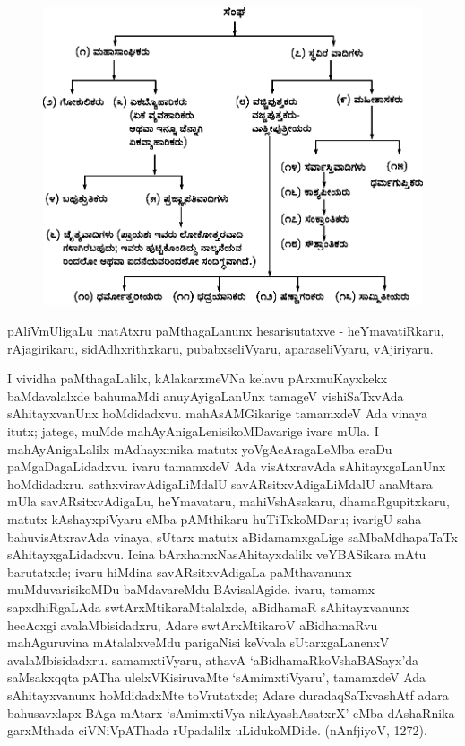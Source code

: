 \begin{figure}[h]
\centering
\includegraphics[scale=.87]{figures/fig3.eps}
\end{figure}
\noindent
pAliVmUligaLu matAtxru paMthagaLanunx hesarisutatxve - heYmavatiRkaru, rAjagirikaru, sidAdhxrithxkaru, pubabxseliVyaru, aparaseliVyaru, vAjiriyaru.

I vividha paMthagaLalilx, kAlakarxmeVNa kelavu pArxmuKayxkekx baMdavalalxde bahumaMdi anuyAyigaLanUnx tamageV vishiSaTxvAda sAhitayxvanUnx hoMdidadxvu. mahAsAMGika\-rige tamamxdeV Ada vinaya itutx; jatege, muMde mahAyAnigaLenisikoMDavarige ivare mUla. I mahAyAnigaLalilx  mAdhayxmika matutx yoVgAcAragaLeMba eraDu paMgaDa\-gaLidadxvu. ivaru tamamxdeV Ada visAtxravAda sAhitayxgaLanUnx  hoMdidadxru. sathxvira\-vAdigaLiMdalU savARsitxvAdigaLiMdalU anaMtara mUla savARsitxvAdigaLu, heYma\-vataru, mahiVshAsakaru, dhamaRgupitxkaru, matutx kAshayxpiVyaru eMba pAMthikaru huTiTx\-koMDaru; ivarigU saha bahuvisAtxravAda vinaya, sUtarx matutx aBidamamxgaLige saMbaMdhapaTaTx sAhitayxgaLidadxvu. Icina bArxhamxNasAhitayxdalilx veYBASikara mAtu barutatxde; ivaru hiMdina savARsitxvAdigaLa paMthavanunx muMduvarisikoMDu baMdavareMdu BAvisalAgide. ivaru, tamamx sapxdhiRgaLAda swtArxMtikaraMtalalxde, aBidhamaR sAhitayx\-vanunx hecAcxgi avalaMbisidadxru, Adare swtArxMtikaroV aBidhamaRvu mahAguruvina mAtalalxveMdu parigaNisi keVvala sUtarxgaLanenxV avalaMbisidadxru. samamxtiVyaru, athavA `aBidhamaRkoVshaBASayx'da saMsakxqqta pATha ulelxVKisiruvaMte `sAmimxtiVyaru', tamamxdeV Ada sAhitayxvanunx hoMdidadxMte toVrutatxde; Adare duradaqSaTxvashAtf adara bahusavxlapx BAga mAtarx `sAmimxtiVya nikAyashAsatxrX' eMba dAshaRnika garxMthada ciVNiVpAThada rUpadalilx uLidukoMDide. (nAnfjiyoV, 1272).

